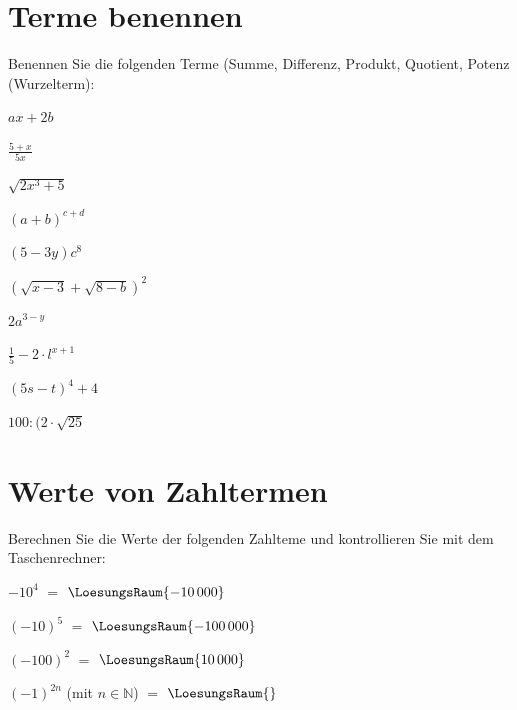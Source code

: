 
\renewcommand{\bbwAufgabenBlockID}{A1Te}

\renewcommand{\metaHeaderLine}{Aufgabenblatt}
\renewcommand{\arbeitsblattTitel}{Algebra: Terme}



\arbeitsblattHeader{}
\section{Terme benennen}
Benennen Sie die folgenden Terme (Summe, Differenz, Produkt, Quotient,
Potenz (Wurzelterm):

\begin{bbwAufgabenBlock}
\item $ax+2b$ \, 
\item $\frac{5+x}{5x}$ \, 
\item $\sqrt{2x^3+5}$ \, 
\item $(a+b)^{c+d}$ \, 
\item $(5-3y)c^8$ \, 
\item $(\sqrt{x-3}+\sqrt{8-b})^2$ \, 
\item $2a^{3-y}$ \, 
\item $\frac15 - 2\cdot{}l^{x+1}$ \, 
\item $(5s-t)^4+4$ \, 
\item $100:(2\cdot{}\sqrt{25}$ \, 
\end{bbwAufgabenBlock}

\platzFuerBerechnungenBisEndeSeite{}



\section{Werte von Zahltermen}
Berechnen Sie die Werte der folgenden Zahlteme und kontrollieren Sie
mit dem Taschenrechner:

\begin{bbwAufgabenBlock}
\item $-10^4$ $=$ $\LoesungsRaum{-10\,000}$
\item $(-10)^5$ $=$ $\LoesungsRaum{-100\,000}$
\item $(-100)^2$ $=$ $\LoesungsRaum{10\,000}$
\item $(-1)^{2n}$  (mit $n\in\mathbb{N}$)  $=$ $\LoesungsRaum{}$

\end{bbwAufgabenBlock}

